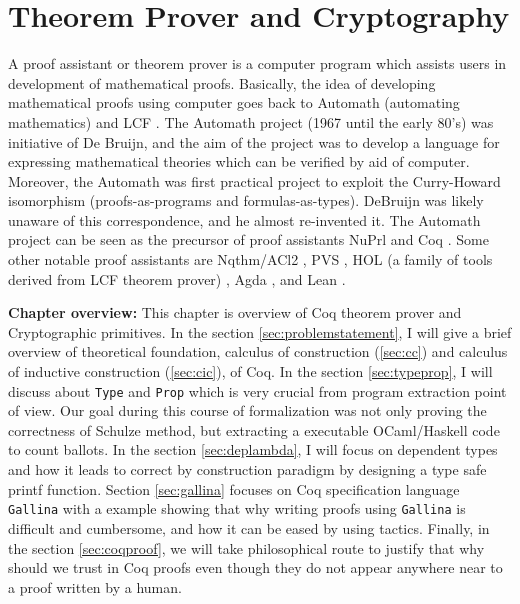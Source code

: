 \chapter{Theorem Prover and Cryptography}
\label{cha:theorem_crypto}
 

A proof assistant or theorem prover is a computer program which assists users in development 
of mathematical proofs. Basically, the idea of 
developing mathematical proofs using computer goes back to Automath (automating mathematics)
\citep{deBruijn1983} and LCF \citep{Milner:1972:IAS:942578.807067}. The 
Automath project (1967 until the early 80's)  was initiative of De Bruijn, and the aim of the project was to 
develop a language for expressing mathematical theories which can be verified by aid of computer.  
Moreover, the Automath was first 
practical project to exploit the Curry-Howard isomorphism (proofs-as-programs and formulas-as-types). 
DeBruijn  was likely unaware of this correspondence, and he almost re-invented it.
The Automath project can be seen as the precursor of
 proof assistants NuPrl \citep{Constable:1986:IMN:10510} and Coq \citep{Bertot:2004:ITP}.  
 Some other notable  proof assistants are 
 Nqthm/ACl2 \citep{507872}, PVS \citep{Owre:1992:PPV:648230.752639},
 HOL (a family of tools derived from LCF theorem prover) \citep{Slind:2008:BOH:1459784.1459792}
 \citep{Harrison:1996:HLT:646184.682934} \citep{Nipkow:2002:IHP},
 Agda \citep{Norell:2008:DTP:1813347.1813352}, and Lean \citep{10.1007/978-3-319-21401-6_26}.


\textbf{Chapter overview:}
 This chapter is overview of Coq theorem prover and Cryptographic primitives. 
 In the section \ref{sec:problemstatement}, I will give a brief overview of 
 theoretical foundation, calculus of construction (\ref{sec:cc}) and calculus of inductive 
 construction (\ref{sec:cic}), of Coq.  In the section \ref{sec:typeprop}, I will discuss about 
 \texttt{Type} and \texttt{Prop}
 which is very crucial from program extraction point of view.  Our goal during 
 this course of formalization was not only proving the correctness of 
 Schulze method, but extracting a executable OCaml/Haskell code to count 
 ballots.  In the section \ref{sec:deplambda}, I will focus 
 on dependent types and  how it leads to correct by construction paradigm
 by designing a  type safe printf function. 
 Section \ref{sec:gallina} focuses on Coq specification language 
 \texttt{Gallina} with a example showing that why writing proofs using  
 \texttt{Gallina} is difficult and cumbersome, and how it can be eased by 
 using tactics. Finally, in the section  \ref{sec:coqproof}, we will take 
 philosophical route to justify that why should we trust in Coq proofs 
 even though they do not appear anywhere near to a proof written by 
 a human. 


